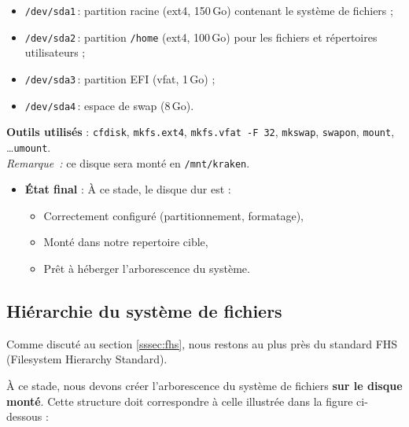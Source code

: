 \begin{itemize}
  \item \texttt{/dev/sda1} : partition racine (ext4, 150 Go) contenant le système de fichiers ;
  \item \texttt{/dev/sda2} : partition \texttt{/home} (ext4, 100 Go) pour les fichiers et répertoires utilisateurs  ;
  \item \texttt{/dev/sda3} : partition EFI (vfat, 1 Go) ;
  \item \texttt{/dev/sda4} : espace de swap (8 Go).
\end{itemize}
\textbf{Outils utilisés} : \texttt{cfdisk}, \texttt{mkfs.ext4}, \texttt{mkfs.vfat -F 32}, \texttt{mkswap}, \texttt{swapon}, \texttt{mount}, \ldots \texttt{umount}.\\
\noindent\textit{Remarque :} ce disque sera monté en \texttt{/mnt/kraken}.
\begin{itemize}
    
\item \textbf{État final} :  
        À ce stade, le disque dur est :  
        \begin{itemize}  
          \item Correctement configuré (partitionnement, formatage),  
          \item Monté dans notre repertoire cible,  
          \item Prêt à héberger l’arborescence du système.  
        \end{itemize}  
\end{itemize}


\clearpage
\subsection{Hiérarchie du système de fichiers }
\label{sssec:hierarchie-preconfig}

Comme discuté au section \textcolor{blue}{ \ref{sssec:fhs}}, nous restons au plus près du standard FHS (Filesystem Hierarchy Standard).

À ce stade, nous devons créer l’arborescence du système de fichiers \textbf{sur le disque monté}. Cette structure doit correspondre à celle illustrée dans la figure ci-dessous : 

